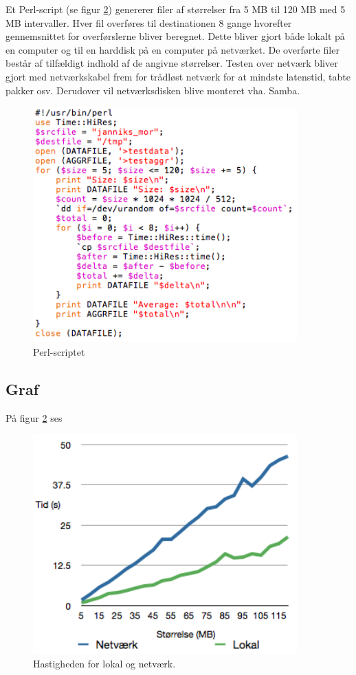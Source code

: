 \documentclass{article}
\begin{document}
Et Perl-script (se figur \ref{ploto}) genererer filer af størrelser fra 5 MB til 120 MB med 5 MB intervaller. Hver fil overføres til destinationen 8 gange hvorefter gennemsnittet for overførslerne bliver beregnet. Dette bliver gjort både lokalt på en computer og til en harddisk på en computer på netværket. De overførte filer består af tilfældigt indhold af de angivne størrelser. Testen over netværk bliver gjort med netværkskabel frem for trådløst netværk for at mindste latenstid, tabte pakker osv. Derudover vil netværksdisken blive monteret vha. Samba.

\begin{figure}
	\includegraphics[width=4in]{kode.png}
	\caption{Perl-scriptet}
	\label{ploto}
\end{figure}

\subsection{Graf}
På figur \ref{ploto} ses 

\begin{figure}
	\includegraphics[width=4in]{ploto.png}
	\caption{Hastigheden for lokal og netværk.}
	\label{ploto}
\end{figure}
\end{document}

